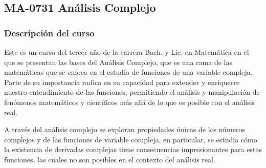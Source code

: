 \newpage
\subsection*{MA-0731 Análisis Complejo}

\hypertarget{MA0731}{}
\begin{refsection}
\begin{table}[H]
\end{table}



\subsubsection*{Descripción del curso}

Este es un curso del tercer año de la carrera Bach. y Lic. en Matemática en el que se presentan las bases del Análisis Complejo, que es una rama de las matemáticas que se enfoca en el estudio de funciones de una variable compleja. Parte de su importancia radica en su capacidad para extender y enriquecer nuestro entendimiento de las funciones, permitiendo el análisis y manipulación de fenómenos matemáticos y científicos más allá de lo que es posible con el análisis real. 

A través del análisis complejo se exploran propiedades únicas de los números complejos y de las funciones de variable compleja, en particular, se estudia cómo la existencia de derivadas complejas tiene consecuencias impresionantes para estas funciones, las cuales no son posibles en el contexto del análisis real.


\end{refsection}
